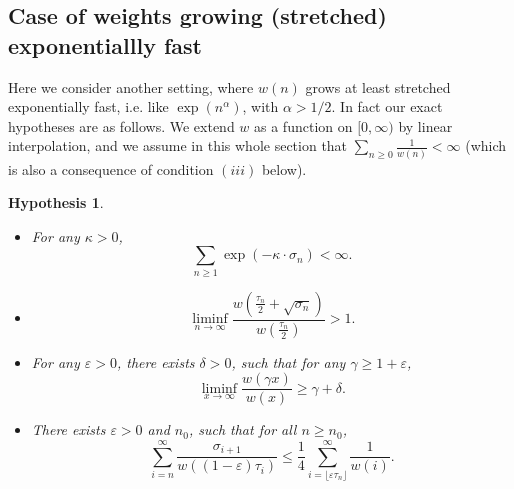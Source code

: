\documentclass[10pt,a4paper]{amsart}
\newtheorem {Hypo} {Hypothesis} [section]
\newcommand{\1}{{\text{\Large $\mathfrak 1$}}}
\begin{document}
\subsection{Case of weights growing (stretched) exponentiallly fast}\label{sec:GPU3}
Here we consider another setting, where $w(n)$ grows at least stretched exponentially fast, i.e. like $\exp(n^\alpha)$, with $\alpha>1/2$. In fact our exact hypotheses are as follows. We extend $w$ as a function on $[0,\infty)$ by linear interpolation, and we assume in this whole section that $\sum_{n\ge 0} \frac 1{w(n)}<\infty$ (which is also a consequence of condition $(iii)$ below).  


\begin{Hypo}\label{hypo}
\begin{itemize}
\item[$(i)$] For any $\kappa>0$, 
$$\sum_{n\ge 1} \exp(-\kappa \cdot\sigma_n)<\infty. $$ 
\item[$(ii)$] $$\liminf_{n\to \infty} \frac{w( \frac{\tau_n}{2} + \sqrt{\sigma_n})}{w(\frac{\tau_n}{2})} >1. $$ 
\item[$(iii)$]  For any $\varepsilon>0$, there exists $\delta>0$, such that for any $\gamma\ge 1+\varepsilon$, 
$$\liminf_{x\to \infty} \frac{w(\gamma x)}{w(x)} \ge  \gamma + \delta. $$ 
\item[$(iv)$]  There exists $\varepsilon>0$ and $n_0$, such that for all $n\ge n_0$,  
$$\sum_{i=n}^\infty \frac{\sigma_{i+1}}{w((1-\varepsilon)\tau_i)} \le \frac 14 \sum_{i = \lfloor \varepsilon \tau_n\rfloor }^\infty \frac 1{w(i)}. $$ 
\end{itemize}
\end{Hypo}
\end{document}
